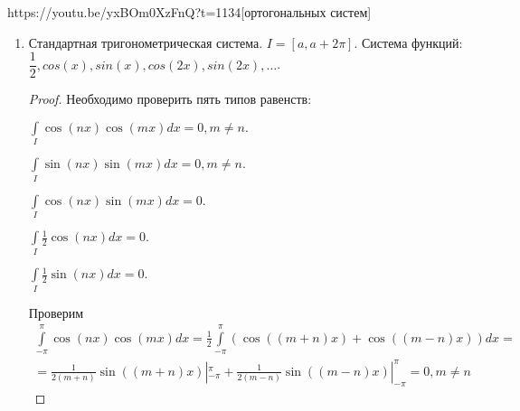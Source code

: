 \begin{linkex}{https://youtu.be/yxBOm0XzFnQ?t=1134}[ортогональных систем]
\begin{enumerate}
\begin{proof}
			$\dfrac{d^{j+1}}{dx^{j+1}}((x^2-1)^n)=\left((x-1)^{n-j}g_j(x)\right)'=(n-j)(x-1)^{n-j-1}g_j(x)+(x-1)^{n-j}g_j'(x)=(x-1)^{n-(j+1)}((n-j)g_j(x)+(x-1)g_j'(x))$. В качестве $g_{j+1}(x)=(n-j)g_j(x)+(x-1)g_j'(x)$.
			
			Следующее утверждение будет также справедливо: $\dfrac{d^j}{dx^j}((x^2-1)^n)=(x+1)^{n-j}g_j(x)$, где $g_j(x)$ --- многочлены степени $n$, для $j=0,1,\ldots, n$.
			
			Возвращаясь к доказательству получаем, что
			
			$\dfrac{d^{j}}{dx^j}((x^2-1)^n)|_{x=\pm1}=0, j=0,\ldots,n-1$. Интегрируя по частям $\mathcal{J}$, загоняя первый сомножитель под дифференциал, получаем: 
			\begin{multline*}
				\mathcal{J}=-\int\limits_{-1}^1\dfrac{d^{n-1}}{dx^{n-1}}((x^2-1)^n)\dfrac{d^{k+1}}{dx^{k+1}}((x^2-1)^k)dx=\overset{n \text{ раз интегрируя по частям}}{\ldots}=\\=(-1)^n\int\limits_{-1}^1(x^2-1)^n\dfrac{d^{k+1}}{dx^{k+n}}((x^2-1)^k)dx=0,
			\end{multline*}
			так как берем производную порядка больше чем степень многочлена:$k+n>2\cdot  k$.
		\end{proof}
		\item Стандартная тригонометрическая система. $I=[a,a+2\pi]$. Система функций: $\dfrac{1}{2}, cos(x),sin(x),cos(2x),sin(2x),\ldots$.
		\begin{proof}
			Необходимо проверить пять типов равенств:
			
			$\int\limits_{I}\cos(nx)\cos(mx)dx=0, m\ne n.$
			
			$\int\limits_{I}\sin(nx)\sin(mx)dx=0, m\ne n.$
			
			$\int\limits_{I}\cos(nx)\sin(mx)dx=0.$
			
			$\int\limits_{I}\frac{1}{2}\cos(nx)dx=0.$
			
			$\int\limits_{I}\frac{1}{2}\sin(nx)dx=0.$
			
			Проверим
			\begin{multline*}
				\int\limits_{-\pi}^{\pi}\cos(nx)\cos(mx)dx=\frac{1}{2}\int\limits_{-\pi}^{\pi}(\cos((m+n)x)+\cos((m-n)x))dx=\\= \frac{1}{2(m+n)}\sin((m+n)x)|_{-\pi}^{\pi}+\frac{1}{2(m-n)}\sin((m-n)x)|_{-\pi}^{\pi}=0, m\ne n
			\end{multline*} 
		\end{proof}
	\end{enumerate}
\end{linkex}


